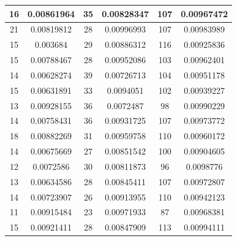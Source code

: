 \documentclass{article}
\begin{document}
\begin{tabular}{cccccc}
16&0.00861964&35&0.00828347&107&0.00967472 \\ \hline
21&0.00819812&28&0.00996993&107&0.00983989 \\ \hline
15&0.003684&29&0.00886312&116&0.00925836 \\ \hline
15&0.00788467&28&0.00952086&103&0.00962401 \\ \hline
14&0.00628274&39&0.00726713&104&0.00951178 \\ \hline
15&0.00631891&33&0.0094051&102&0.00939227 \\ \hline
13&0.00928155&36&0.0072487&98&0.00990229 \\ \hline
14&0.00758431&36&0.00931725&107&0.00973772 \\ \hline
18&0.00882269&31&0.00959758&110&0.00960172 \\ \hline
14&0.00675669&27&0.00851542&100&0.00904605 \\ \hline
12&0.0072586&30&0.00811873&96&0.0098776 \\ \hline
13&0.00634586&28&0.00845411&107&0.00972807 \\ \hline
14&0.00723907&26&0.00913955&110&0.00942123 \\ \hline
11&0.00915484&23&0.00971933&87&0.00968381 \\ \hline
15&0.00921411&28&0.00847909&113&0.00994111 \\ \hline
\end{tabular}
\end{document}
